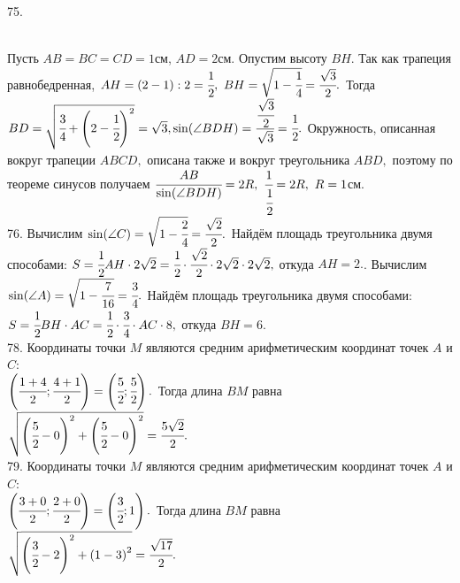 \documentclass[12pt]{article}
\begin{document}
75. \begin{figure}[ht!]
\end{figure}\\
Пусть $AB=BC=CD=1$см, $AD=2$см. Опустим высоту $BH.$ Так как трапеция равнобедренная, $AH=(2-1):2=\cfrac{1}{2},\ BH=\sqrt{1-\cfrac{1}{4}}=\cfrac{\sqrt{3}}{2}.$ Тогда $BD=\sqrt{\cfrac{3}{4}+\left(2-\cfrac{1}{2}\right)^2}=\sqrt{3}, \sin(\angle BDH)=\cfrac{\cfrac{\sqrt{3}}{2}}{\sqrt{3}}=\cfrac{1}{2}.$ Окружность, описанная вокруг трапеции $ABCD,$ описана также и вокруг треугольника $ABD,$ поэтому по теореме синусов получаем $\cfrac{AB}{\sin(\angle BDH)}=2R,\ \cfrac{1}{\cfrac{1}{2}}=2R,\ R=1$см.\\
76. Вычислим $\sin(\angle C)=\sqrt{1-\cfrac{2}{4}}=\cfrac{\sqrt{2}}{2}.$ Найдём площадь треугольника двумя способами: $S=\cfrac{1}{2}AH\cdot 2\sqrt{2}=\cfrac{1}{2}\cdot\cfrac{\sqrt{2}}{2}\cdot 2\sqrt{2}\cdot2\sqrt{2},$ откуда $AH=2.$\newpage{}. Вычислим $\sin(\angle A)=\sqrt{1-\cfrac{7}{16}}=\cfrac{3}{4}.$ Найдём площадь треугольника двумя способами: $S=\cfrac{1}{2}BH\cdot AC=\cfrac{1}{2}\cdot\cfrac{3}{4}\cdot AC\cdot8,$ откуда $BH=6.$\\
78. Координаты точки $M$ являются средним арифметическим координат точек $A$ и $C:$\\$ \left(\cfrac{1+4}{2}; \cfrac{4+1}{2}\right)=\left(\cfrac{5}{2};\cfrac{5}{2}\right).$ Тогда длина $BM$ равна $\sqrt{\left(\cfrac{5}{2}-0\right)^2+\left(\cfrac{5}{2}-0\right)^2}=\cfrac{5\sqrt{2}}{2}.$\\
79. Координаты точки $M$ являются средним арифметическим координат точек $A$ и $C:$\\$ \left(\cfrac{3+0}{2}; \cfrac{2+0}{2}\right)=\left(\cfrac{3}{2};1\right).$ Тогда длина $BM$ равна $\sqrt{\left(\cfrac{3}{2}-2\right)^2+\left(1-3\right)^2}=\cfrac{\sqrt{17}}{2}.$\\
\end{document}

